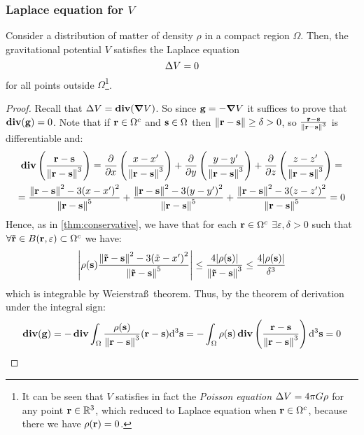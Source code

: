 \documentclass[../main.tex]{subfiles}
\begin{document}
\subsubsection{Laplace equation for \texorpdfstring{$V$}{V}}
\begin{theorem}
  Consider a distribution of matter of density $\rho$ in a compact region $\Omega$. Then, the gravitational potential $V$ satisfies the Laplace equation
  \begin{equation}
    \laplacian V = 0
  \end{equation}
  for all points outside $\Omega$\footnote{It can be seen that $V$ satisfies in fact the \emph{Poisson equation} $\laplacian V=4\pi G\rho$ for any point $\vf{r}\in\RR^3$, which reduced to Laplace equation when $\vf{r}\in\Omega^c$, because there we have $\rho(\vf{r})=0$.}.
\end{theorem}
\begin{proof}
  Recall that $\laplacian V=\div(\grad V)$. So since $\vf{g}=-\grad V$ it suffices to prove that $\div(\vf{g})=0$. Note that if $\vf{r}\in\Omega^c$ and $\vf{s}\in\Omega$ then $\norm{\vf{r}-\vf{s}}\geq\delta>0$, so $\frac{\vf{r}-\vf{s}}{\norm{\vf{r}-\vf{s}}^3}$ is differentiable and:
  \begin{multline*}
    \div\left(\frac{\vf{r}-\vf{s}}{\norm{\vf{r}-\vf{s}}^3}\right)=\pdv{}{x}\left(\frac{x-x'}{\norm{\vf{r}-\vf{s}}^3}\right)+\pdv{}{y}\left(\frac{y-y'}{\norm{\vf{r}-\vf{s}}^3}\right)+\pdv{}{z}\left(\frac{z-z'}{\norm{\vf{r}-\vf{s}}^3}\right)=\\
    =\frac{\norm{\vf{r}-\vf{s}}^2-3{(x-x')}^2}{\norm{\vf{r}-\vf{s}}^5}+\frac{\norm{\vf{r}-\vf{s}}^2-3{(y-y')}^2}{\norm{\vf{r}-\vf{s}}^5}+\frac{\norm{\vf{r}-\vf{s}}^2-3{(z-z')}^2}{\norm{\vf{r}-\vf{s}}^5} =0
  \end{multline*}
  Hence, as in \cref{thm:conservative}, we have that for each $\vf{r}\in\Omega^c$ $\exists\varepsilon,\delta>0$ such that $\forall \vf{\tilde{r}} \in B(\vf{r},\varepsilon)\subset\Omega^c$ we have:
  $$
    \abs{\rho(\vf{s})\frac{\norm{\vf{\tilde{r}}-\vf{s}}^2-3{(\tilde{x}-x')}^2}{\norm{\vf{\tilde{r}}-\vf{s}}^5}}\leq \frac{4\abs{\rho(\vf{s})}}{\norm{\vf{\tilde{r}}-\vf{s}}^3}\leq \frac{4\abs{\rho(\vf{s})}}{\delta^3}
  $$
  which is integrable by Weierstra\ss\ theorem. Thus, by the theorem of derivation under the integral sign:
  \begin{equation}
    \div(\vf{g})=-\div\int_\Omega\frac{\rho(\vf{s})}{\norm{\vf{r}-\vf{s}}^3}(\vf{r}-\vf{s})\dd^3{\vf{s}}=-\int_\Omega\rho(\vf{s})\div\left(\frac{\vf{r}-\vf{s}}{\norm{\vf{r}-\vf{s}}^3}\right)\dd^3{\vf{s}}=0
  \end{equation}
\end{proof}
\end{document}

